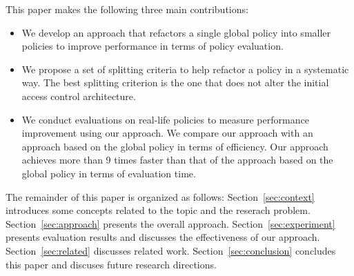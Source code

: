 This paper makes the following three main contributions:
\begin{itemize}
\item We develop an approach that refactors a single global policy into smaller policies to improve performance in terms of policy evaluation.
\item We propose a set of splitting criteria to help refactor a policy in a systematic way. The best splitting criterion is the one
that does not alter the initial access control architecture.
\item We conduct evaluations on real-life policies to measure performance improvement
using our approach. We compare our approach with an approach based on the global policy in terms of
efficiency. Our approach achieves more than 9 times faster than that of the approach based on the global policy in terms of evaluation time.
\end{itemize}


The remainder of this paper is organized as follows: Section~\ref{sec:context} introduces some concepts related to the topic and the reserach problem.
Section~\ref{sec:approach} presents the overall approach. 
Section~\ref{sec:experiment} presents evaluation results and discusses the effectiveness of our approach. Section~\ref{sec:related} discusses related work.
Section~\ref{sec:conclusion} concludes this paper and discuses future research directions.

